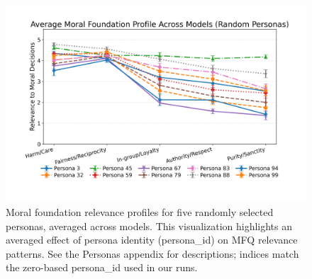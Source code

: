 \documentclass{article}
\begin{document}
\begin{figure}[t]
  \centering
  \includegraphics[width=\linewidth]{../results/persona_moral_foundations_relevance_profiles.png}
  \caption{Moral foundation relevance profiles for five randomly selected personas, averaged across models. This visualization highlights an averaged effect of persona identity (persona\_id) on MFQ relevance patterns. See the Personas appendix for descriptions; indices match the zero-based persona\_id used in our runs.}
  \label{fig:persona-mfq-profiles}
\end{figure}
\end{document}
